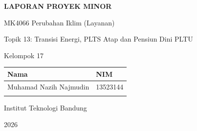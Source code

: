 \begin{titlepage}
\centering
\vspace*{1.5cm}
{\Large\bfseries LAPORAN PROYEK MINOR\par}
\vspace{0.4cm}
{\large MK4066 Perubahan Iklim (Layanan)\par}
\vspace{1.5cm}
{\LARGE\bfseries \judul\par}
\vspace{0.8cm}
{\large Topik 13: Transisi Energi, PLTS Atap dan Pensiun Dini PLTU\par}
\vspace{1.5cm}
{\large Kelompok 17\par}
\vspace{0.8cm}
\begin{tabular}{l l}
\toprule
Nama & NIM \\
\midrule
Muhamad Nazih Najmudin & 13523144 \\
 & \\
\bottomrule
\end{tabular}
\vfill
{\large Institut Teknologi Bandung\par}
{\large 2026\par}
\end{titlepage}
